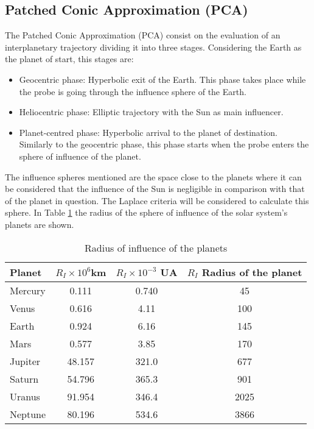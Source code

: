 \subsection{Patched Conic Approximation (PCA)}
The Patched Conic Approximation (PCA) consist on the evaluation of an interplanetary trajectory dividing it into three stages. Considering the Earth as the planet of start, this stages are: 
\begin{itemize}
\item Geocentric phase: Hyperbolic exit of the Earth. This phase takes place while the probe is going through the influence sphere of the Earth. 
\item Heliocentric phase: Elliptic trajectory with the Sun as main influencer.
\item Planet-centred phase: Hyperbolic arrival to the planet of destination. Similarly to the geocentric phase, this phase starts when the probe enters the sphere of influence of the planet. 
\end{itemize}
The influence spheres mentioned are the space close to the planets where it can be considered that the influence of the Sun is negligible in comparison with that of the planet in question. The Laplace criteria will be considered to calculate this sphere. In Table \ref{RIplanets} the radius of the sphere of influence of the solar system's planets are shown. 
\begin{table}[H]
\centering
\begin{tabular}{|lccc|}
\hline
Planet  & $R_I\times 10^6 $km & $R_I\times 10^{-3} $ UA & $R_I$ Radius of the planet \\ \hline
Mercury & 0.111                       & 0.740                        & 45                     \\
Venus   & 0.616                       & 4.11                         & 100                    \\
Earth   & 0.924                       & 6.16                         & 145                    \\
Mars    & 0.577                       & 3.85                         & 170                    \\
Jupiter & 48.157                      & 321.0                        & 677                    \\
Saturn  & 54.796                      & 365.3                        & 901                    \\
Uranus  & 91.954                      & 346.4                        & 2025                   \\
Neptune & 80.196                      & 534.6                        & 3866                   \\ \hline
\end{tabular}
\caption{Radius of influence of the planets}
\label{RIplanets}
\end{table}

